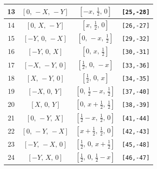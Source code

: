 \documentclass[fleqn,8pt]{jsarticle}
\begin{document}
\begin{longtable}{cccc}
13 & $\left[ 0,\, - X,\, - Y \right]$ & $\left[ - x,\, \frac{1}{2},\, 0 \right]$ & {\tt [25,-28]} \\ \hline
14 & $\left[ 0,\, X,\, - Y \right]$ & $\left[ x,\, \frac{1}{2},\, 0 \right]$ & {\tt [26,-27]} \\ \hline
15 & $\left[ - Y,\, 0,\, - X \right]$ & $\left[ 0,\, - x,\, \frac{1}{2} \right]$ & {\tt [29,-32]} \\ \hline
16 & $\left[ - Y,\, 0,\, X \right]$ & $\left[ 0,\, x,\, \frac{1}{2} \right]$ & {\tt [30,-31]} \\ \hline
17 & $\left[ - X,\, - Y,\, 0 \right]$ & $\left[ \frac{1}{2},\, 0,\, - x \right]$ & {\tt [33,-36]} \\ \hline
18 & $\left[ X,\, - Y,\, 0 \right]$ & $\left[ \frac{1}{2},\, 0,\, x \right]$ & {\tt [34,-35]} \\ \hline
19 & $\left[ - X,\, 0,\, Y \right]$ & $\left[ 0,\, \frac{1}{2} - x,\, \frac{1}{2} \right]$ & {\tt [37,-40]} \\ \hline
20 & $\left[ X,\, 0,\, Y \right]$ & $\left[ 0,\, x + \frac{1}{2},\, \frac{1}{2} \right]$ & {\tt [38,-39]} \\ \hline
21 & $\left[ 0,\, - Y,\, X \right]$ & $\left[ \frac{1}{2} - x,\, \frac{1}{2},\, 0 \right]$ & {\tt [41,-44]} \\ \hline
22 & $\left[ 0,\, - Y,\, - X \right]$ & $\left[ x + \frac{1}{2},\, \frac{1}{2},\, 0 \right]$ & {\tt [42,-43]} \\ \hline
23 & $\left[ - Y,\, - X,\, 0 \right]$ & $\left[ \frac{1}{2},\, 0,\, x + \frac{1}{2} \right]$ & {\tt [45,-48]} \\ \hline
24 & $\left[ - Y,\, X,\, 0 \right]$ & $\left[ \frac{1}{2},\, 0,\, \frac{1}{2} - x \right]$ & {\tt [46,-47]} \\
\end{longtable}
\renewcommand{\arraystretch}{1.2}
\end{document}
